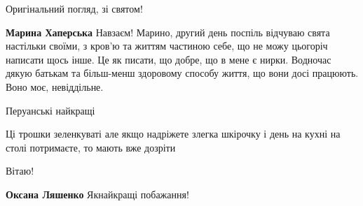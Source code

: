 Оригінальний погляд, зі святом!

 
\textbf{Марина Хаперська}
Навзаєм!
Марино, другий день поспіль відчуваю свята настільки своїми, з кров'ю та життям частиною себе, що не можу цьогоріч написати щось інше.
Це як писати, що добре, що в мене є нирки.
Водночас дякую батькам та більш-менш здоровому способу життя, що вони досі працюють.
Воно моє, невіддільне.

 
Перуанські найкращі

 
Ці трошки зеленкуваті але якщо надріжете злегка шкірочку і день на кухні на столі потримаєте, то мають вже дозріти

 
Вітаю!

 
\textbf{Оксана Ляшенко}
Якнайкращі побажання!

 
